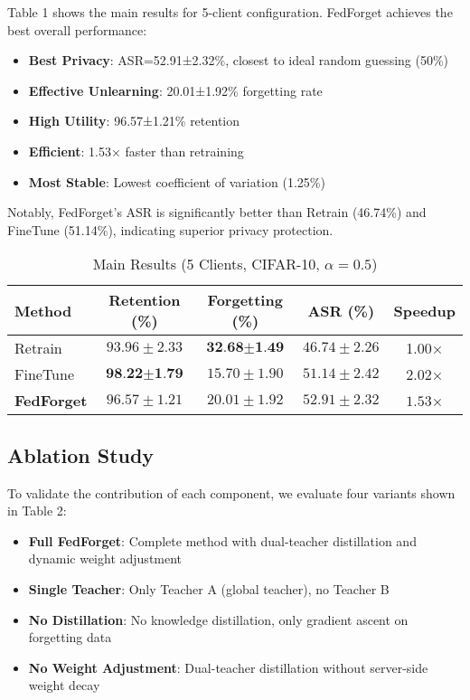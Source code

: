 \documentclass[11pt,a4paper]{article}
\begin{document}
Table 1 shows the main results for 5-client configuration. FedForget achieves the best overall performance:

\begin{itemize}
\item \textbf{Best Privacy}: ASR=52.91±2.32\%, closest to ideal random guessing (50\%)
\item \textbf{Effective Unlearning}: 20.01±1.92\% forgetting rate
\item \textbf{High Utility}: 96.57±1.21\% retention
\item \textbf{Efficient}: 1.53× faster than retraining
\item \textbf{Most Stable}: Lowest coefficient of variation (1.25\%)
\end{itemize}

Notably, FedForget's ASR is significantly better than Retrain (46.74\%) and FineTune (51.14\%), indicating superior privacy protection.

\begin{table}[t]
\centering
\caption{Main Results (5 Clients, CIFAR-10, $\alpha=0.5$)}
\label{tab:main_results}
\begin{tabular}{lcccc}
\toprule
Method & Retention (\%) & Forgetting (\%) & ASR (\%) & Speedup \\
\midrule
Retrain & $93.96 \pm 2.33$ & $\textbf{32.68} \pm \textbf{1.49}$ & $46.74 \pm 2.26$ & 1.00× \\
FineTune & $\textbf{98.22} \pm \textbf{1.79}$ & $15.70 \pm 1.90$ & $51.14 \pm 2.42$ & 2.02× \\
\textbf{FedForget} & $\mathbf{96.57} \pm \mathbf{1.21}$ & $20.01 \pm 1.92$ & $\mathbf{52.91} \pm \mathbf{2.32}$ & $\mathbf{1.53}$× \\
\bottomrule
\end{tabular}
\end{table}

\subsection{Ablation Study}

To validate the contribution of each component, we evaluate four variants shown in Table 2:

\begin{itemize}
\item \textbf{Full FedForget}: Complete method with dual-teacher distillation and dynamic weight adjustment
\item \textbf{Single Teacher}: Only Teacher A (global teacher), no Teacher B
\item \textbf{No Distillation}: No knowledge distillation, only gradient ascent on forgetting data
\item \textbf{No Weight Adjustment}: Dual-teacher distillation without server-side weight decay
\end{itemize}
\end{document}
